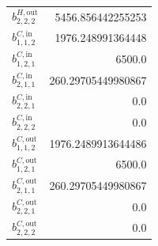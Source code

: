 \documentclass{article}%
\begin{document}
\begin{multicols*}{3}
\begin{supertabular}{lr}
	$b_{2,2,2}^{H,\text{out}}$ & 5456.856442255253 \\%
	$b_{1,1,2}^{C,\text{in}}$ & 1976.248991364448 \\%
	$b_{1,2,1}^{C,\text{in}}$ & 6500.0 \\%
	$b_{2,1,1}^{C,\text{in}}$ & 260.29705449980867 \\%
	$b_{2,2,1}^{C,\text{in}}$ & 0.0 \\%
	$b_{2,2,2}^{C,\text{in}}$ & 0.0 \\%
	$b_{1,1,2}^{C,\text{out}}$ & 1976.2489913644486 \\%
	$b_{1,2,1}^{C,\text{out}}$ & 6500.0 \\%
	$b_{2,1,1}^{C,\text{out}}$ & 260.29705449980867 \\%
	$b_{2,2,1}^{C,\text{out}}$ & 0.0 \\%
	$b_{2,2,2}^{C,\text{out}}$ & 0.0 \\%
\end{supertabular}%
\end{multicols*}%
\end{document}
